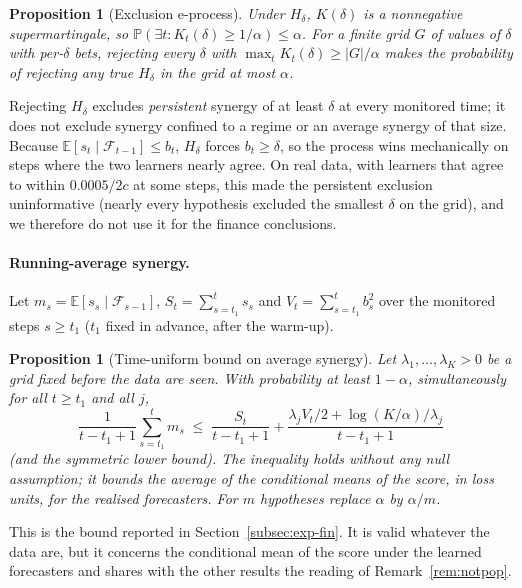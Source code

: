 \documentclass[pdflatex,sn-mathphys-ay]{sn-jnl}%
\theoremstyle{thmstyleone}%
\newtheorem{proposition}[theorem]{Proposition}%
\theoremstyle{thmstyletwo}%
\theoremstyle{thmstylethree}%
\newcommand{\E}{\mathbb{E}}
\newcommand{\Prob}{\mathbb{P}}
\newcommand{\F}{\mathcal{F}}
\begin{document}
\begin{proposition}[Exclusion e-process]\label{prop:excl}
Under $H_\delta$, $K(\delta)$ is a nonnegative supermartingale, so $\Prob(\exists t:K_t(\delta)\ge1/\alpha)\le\alpha$. For a finite grid $G$ of values of $\delta$ with per-$\delta$ bets,
rejecting every $\delta$ with $\max_tK_t(\delta)\ge|G|/\alpha$ makes the probability of rejecting any true $H_\delta$ in the grid at most $\alpha$.
\end{proposition}

Rejecting $H_\delta$ excludes \emph{persistent} synergy of at least $\delta$ at every monitored time; it does not exclude synergy confined to a regime or an average synergy of that size. Because
$\E[s_t\mid\F_{t-1}]\le b_t$, $H_\delta$ forces $b_t\ge\delta$, so the process wins mechanically on steps where the two learners nearly agree. On real data, with learners that agree to within $0.0005/2c$ at
some steps, this made the persistent exclusion uninformative (nearly every hypothesis excluded the smallest $\delta$ on the grid), and we therefore do not use it for the finance conclusions.

\paragraph{Running-average synergy.} Let $m_s=\E[s_s\mid\F_{s-1}]$, $S_t=\sum_{s=t_1}^{t}s_s$ and $V_t=\sum_{s=t_1}^{t}b_s^2$ over the monitored steps $s\ge t_1$ ($t_1$ fixed in advance, after the warm-up).

\begin{proposition}[Time-uniform bound on average synergy]\label{prop:avg}
Let $\lambda_1,\dots,\lambda_K>0$ be a grid fixed before the data are seen. With probability at least $1-\alpha$, simultaneously for all $t\ge t_1$ and all $j$,
\[
\frac1{t-t_1+1}\sum_{s=t_1}^{t}m_s\;\le\;\frac{S_t}{t-t_1+1}+\frac{\lambda_jV_t/2+\log(K/\alpha)/\lambda_j}{t-t_1+1}
\]
(and the symmetric lower bound). The inequality holds without any null assumption; it bounds the average of the conditional means of the score, in loss units, for the
realised forecasters. For $m$ hypotheses replace $\alpha$ by $\alpha/m$.
\end{proposition}

This is the bound reported in Section~\ref{subsec:exp-fin}. It is valid whatever the data are, but it concerns the conditional mean of the score under the learned forecasters and shares with the other results the
reading of Remark~\ref{rem:notpop}.
\end{document}
